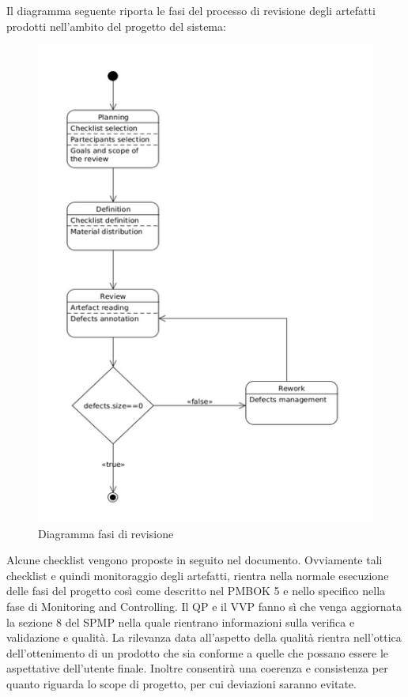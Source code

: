 Il diagramma seguente riporta le fasi del processo di revisione degli artefatti prodotti nell\rq ambito del progetto del sistema:
\begin{figure}[h]
\centering
\includegraphics[scale=.6]{img/13.png}
\caption{Diagramma fasi di revisione}
\label{fig:cd}
\end{figure}
Alcune checklist vengono proposte in seguito nel documento. Ovviamente tali checklist e quindi monitoraggio degli artefatti, rientra nella normale esecuzione delle fasi del progetto cos\`{i} come descritto nel PMBOK 5 e nello specifico nella fase di Monitoring and Controlling.
Il QP e il VVP fanno s\`{i} che venga aggiornata la sezione 8 del SPMP nella quale rientrano informazioni sulla verifica e validazione e qualit\`{a}.
La rilevanza data all\rq aspetto della qualit\`{a} rientra nell\rq ottica dell\rq ottenimento di un prodotto che sia conforme a quelle che possano essere le aspettative dell\rq utente finale.
Inoltre consentir\`{a} una coerenza e consistenza per quanto riguarda lo scope di progetto, per cui deviazioni saranno evitate.
